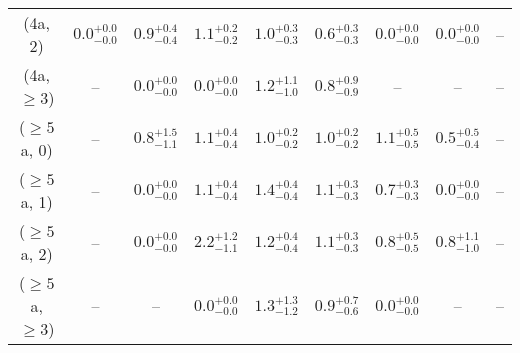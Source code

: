 \begin{table}[h!]
{\begin{tabular}{ccccccccc}
	(4a, 2) & $0.0^{+ 0.0 }_{- 0.0 }$ & $0.9^{+ 0.4 }_{- 0.4 }$ & $1.1^{+ 0.2 }_{- 0.2 }$ & $1.0^{+ 0.3 }_{- 0.3 }$ & $0.6^{+ 0.3 }_{- 0.3 }$ & $0.0^{+ 0.0 }_{- 0.0 }$ & $0.0^{+ 0.0 }_{- 0.0 }$ & -- \\[0.5ex] 
	(4a, $\ge3$) & -- & $0.0^{+ 0.0 }_{- 0.0 }$ & $0.0^{+ 0.0 }_{- 0.0 }$ & $1.2^{+ 1.1 }_{- 1.0 }$ & $0.8^{+ 0.9 }_{- 0.9 }$ & -- & -- & -- \\[0.5ex] 
	($\ge5$a, 0) & -- & $0.8^{+ 1.5 }_{- 1.1 }$ & $1.1^{+ 0.4 }_{- 0.4 }$ & $1.0^{+ 0.2 }_{- 0.2 }$ & $1.0^{+ 0.2 }_{- 0.2 }$ & $1.1^{+ 0.5 }_{- 0.5 }$ & $0.5^{+ 0.5 }_{- 0.4 }$ & -- \\[0.5ex] 
	($\ge5$a, 1) & -- & $0.0^{+ 0.0 }_{- 0.0 }$ & $1.1^{+ 0.4 }_{- 0.4 }$ & $1.4^{+ 0.4 }_{- 0.4 }$ & $1.1^{+ 0.3 }_{- 0.3 }$ & $0.7^{+ 0.3 }_{- 0.3 }$ & $0.0^{+ 0.0 }_{- 0.0 }$ & -- \\[0.5ex] 
	($\ge5$a, 2) & -- & $0.0^{+ 0.0 }_{- 0.0 }$ & $2.2^{+ 1.2 }_{- 1.1 }$ & $1.2^{+ 0.4 }_{- 0.4 }$ & $1.1^{+ 0.3 }_{- 0.3 }$ & $0.8^{+ 0.5 }_{- 0.5 }$ & $0.8^{+ 1.1 }_{- 1.0 }$ & -- \\[0.5ex] 
	($\ge5$a, $\ge3$) & -- & -- & $0.0^{+ 0.0 }_{- 0.0 }$ & $1.3^{+ 1.3 }_{- 1.2 }$ & $0.9^{+ 0.7 }_{- 0.6 }$ & $0.0^{+ 0.0 }_{- 0.0 }$ & -- & -- \\[0.5ex] 
	\hline
	\hline
\end{tabular}}
\end{table}
